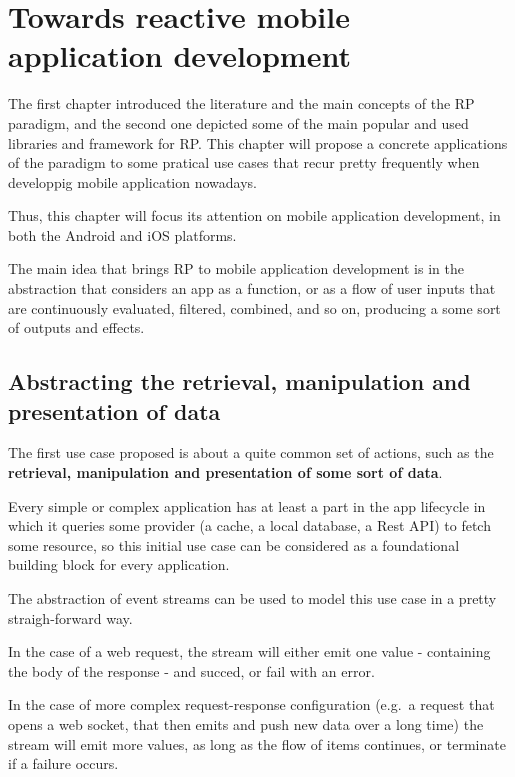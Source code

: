 \chapter{Towards reactive mobile application development}\label{towards-reactive-mobile-application-development}

The first chapter introduced the literature and the main concepts of the
RP paradigm, and the second one depicted some of the main popular and
used libraries and framework for RP. This chapter will propose a
concrete applications of the paradigm to some pratical use cases that
recur pretty frequently when developpig mobile application nowadays.

Thus, this chapter will focus its attention on mobile application
development, in both the Android and iOS platforms.

The main idea that brings RP to mobile application development is in the
abstraction that considers an app as a function, or as a flow of user
inputs that are continuously evaluated, filtered, combined, and so on,
producing a some sort of outputs and effects.


\section{Abstracting the retrieval, manipulation and presentation of
data}\label{abstracting-the-retrieval-manipulation-and-presentation-of-data}

The first use case proposed is about a quite common set of actions, such
as the \textbf{retrieval, manipulation and presentation of some sort of
data}.

Every simple or complex application has at least a part in the app
lifecycle in which it queries some provider (a cache, a local database,
a Rest API) to fetch some resource, so this initial use case can be
considered as a foundational building block for every application.

The abstraction of event streams can be used to model this use case in a
pretty straigh-forward way.

In the case of a web request, the stream will either emit one value -
containing the body of the response - and succed, or fail with an error.

In the case of more complex request-response configuration (e.g.~a
request that opens a web socket, that then emits and push new data over
a long time) the stream will emit more values, as long as the flow of
items continues, or terminate if a failure occurs.

